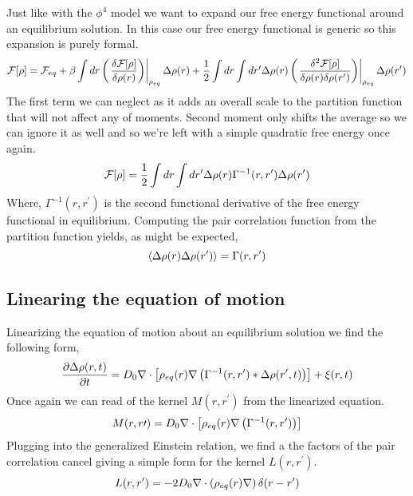 Just like with the $\phi^4$ model we want to expand our free energy functional
around an equilibrium solution. In this case our free energy functional is
generic so this expansion is purely formal.
%
\begin{equation} \mathcal{F}[\rho] = \mathcal{F}_{eq} + \beta\int dr \left(\left.\frac{\delta \mathcal{F}[\rho]}{\delta
\rho(r)}\right)\right\vert_{\rho_{eq}}\Delta\rho(r) + \frac{1}{2} \int dr \int dr^\prime
\Delta\rho(r) \left(\left.\frac{\delta^2 \mathcal{F}[\rho]}{\delta \rho(r) \delta
\rho(r^\prime)}\right)\right\vert_{\rho_{eq}} \Delta\rho(r^\prime) \end{equation}
%
The first term we can neglect as it adds an overall scale to the partition
function that will not affect any of moments. Second moment only shifts the
average so we can ignore it as well and so we're left with a simple quadratic
free energy once again.
%
\begin{equation} \mathcal{F}[\rho] = \frac{1}{2}\int dr \int dr^\prime \Delta \rho(r)
\Gamma^{-1}(r, r^\prime) \Delta \rho(r^\prime) \end{equation}
%
Where, $\Gamma^{-1}(r, r^\prime)$ is the second functional derivative of the
free energy functional in equilibrium. Computing the pair correlation function
from the partition function yields, as might be expected,
%
\begin{equation} \left\langle \Delta\rho(r) \Delta\rho(r^\prime) \right\rangle =
\Gamma(r, r^\prime) \end{equation}
%
\subsection{Linearing the equation of motion} %

Linearizing the equation of motion about an equilibrium solution we find the
following form,
%
\begin{equation} \frac{\partial \Delta \rho (r, t)}{\partial t} = D_0\nabla \cdot
\left[\rho_{eq}(r)\nabla \left(\Gamma^{-1}(r, r^\prime)\ast \Delta\rho(r^\prime,
t)\right)\right] + \xi(r, t) \end{equation}
%
Once again we can read of the kernel $M(r, r^\prime)$ from the linearized
equation.
%
\begin{equation} M(r, r\prime) = D_0\nabla \cdot \left[\rho_{eq}(r)\nabla
\left(\Gamma^{-1}(r, r^\prime)\right)\right] \end{equation}
%
Plugging into the generalized Einstein relation, we find a the factors of the
pair correlation cancel giving a simple form for the kernel $L(r, r^\prime)$.
%
\begin{equation} L(r, r^\prime) =
-2D_0\nabla\cdot\left(\rho_{eq}(r)\nabla\right)\delta(r - r^\prime) \end{equation}
%

\nocite{Ronis, Fox_and_Uhlenbeck, Lax}
